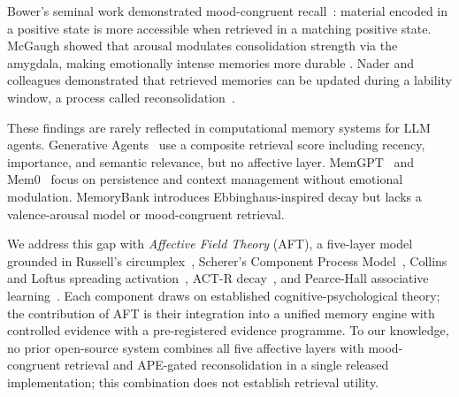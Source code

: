 \documentclass[11pt]{article}
\begin{document}
Bower's seminal work demonstrated mood-congruent recall~\citep{bower1981mood}:
material encoded in a positive state is more accessible when retrieved in a
matching positive state. McGaugh showed that arousal modulates consolidation
strength via the amygdala, making emotionally intense memories more durable
\citep{mcgaugh2004amygdala}. Nader and colleagues demonstrated that retrieved
memories can be updated during a lability window, a process called
reconsolidation~\citep{nader2000fear}.

These findings are rarely reflected in computational memory systems for LLM agents.
Generative Agents~\citep{park2023generative} use a composite retrieval score
including recency, importance, and semantic relevance, but no affective layer.
MemGPT~\citep{packer2023memgpt} and Mem0~\citep{chhikara2025mem0} focus on
persistence and context management without emotional modulation. MemoryBank
\citep{zhong2023memorybank} introduces Ebbinghaus-inspired decay but lacks a
valence-arousal model or mood-congruent retrieval.

We address this gap with \emph{Affective Field Theory} (AFT), a five-layer model
grounded in Russell's circumplex~\citep{russell1980circumplex}, Scherer's Component
Process Model~\citep{scherer1984appraisal}, Collins and Loftus spreading
activation~\citep{collins1975spreading}, ACT-R decay~\citep{anderson1983actr},
and Pearce-Hall associative learning~\citep{pearce1980hall}.
Each component draws on established cognitive-psychological theory; the contribution
of AFT is their integration into a unified memory engine with controlled evidence
with a pre-registered evidence programme. To our knowledge, no prior open-source
system combines all five affective layers with mood-congruent retrieval and
APE-gated reconsolidation in a single released implementation; this combination does not establish retrieval utility.
\end{document}
